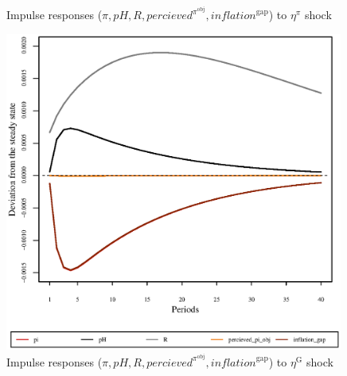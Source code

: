 \begin{figure}[h]
\begin{minipage}{0.5\textwidth}
\caption{Impulse responses ($\pi, {p\!H}, R, {p\!e\!r\!c\!i\!e\!v\!e\!d}^{\pi^{\mathrm{obj}}}, {i\!n\!f\!l\!a\!t\!i\!o\!n}^{\mathrm{gap}}$) to $\eta^{\pi}$ shock}
\end{minipage}
\end{figure}

\pagebreak

\begin{figure}[h]
\centering
\begin{minipage}{0.5\textwidth}
\vspace*{-3em}
\centering
\includegraphics[width=0.99\textwidth, scale=0.55]{plots/plot_135.eps}
\caption{Impulse responses ($\pi, {p\!H}, R, {p\!e\!r\!c\!i\!e\!v\!e\!d}^{\pi^{\mathrm{obj}}}, {i\!n\!f\!l\!a\!t\!i\!o\!n}^{\mathrm{gap}}$) to $\eta^{\mathrm{G}}$ shock}
\end{minipage}
\end{figure}
